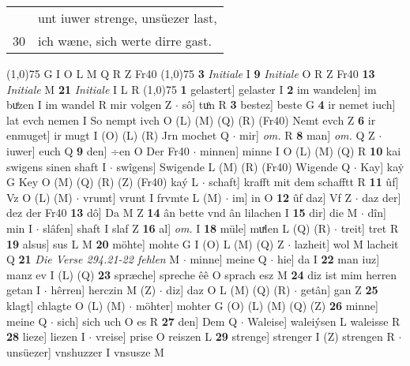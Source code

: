 \documentclass[8pt,a4paper,notitlepage]{article}
\begin{document}
\begin{table}[ht]
\begin{minipage}[t]{0.5\linewidth}
\begin{tabular}{rl}
 & unt iuwer strenge, unsüezer last,\\ 
30 & ich wæne, sich werte dirre gast.\\ 
\end{tabular}
\scriptsize
\line(1,0){75} \newline
G I O L M Q R Z Fr40 \newline
\line(1,0){75} \newline
\textbf{3} \textit{Initiale} I  \textbf{9} \textit{Initiale} O R Z Fr40  \textbf{13} \textit{Initiale} M  \textbf{21} \textit{Initiale} I L R  \newline
\line(1,0){75} \newline
\textbf{1} gelastert] gelaster I \textbf{2} im wandelen] im buͤzen I im wandel R mir volgen Z  $\cdot$ sô] tuͦn R \textbf{3} bestez] beste G \textbf{4} ir nemet iuch] lat evch nemen I So nempt ivch O (L) (M) (Q) (R) (Fr40) Nemt evch Z \textbf{6} ir enmuget] ir mugt I (O) (L) (R) Jrn mochet Q  $\cdot$ mir] \textit{om.} R \textbf{8} man] \textit{om.} Q Z  $\cdot$ iuwer] euch Q \textbf{9} den] ÷en O Der Fr40  $\cdot$ minnen] minne I O (L) (M) (Q) R \textbf{10} kai swigens sinen shaft I  $\cdot$ swîgens] Swigende L (M) (R) (Fr40) Wigende Q  $\cdot$ Kay] kaẏ G Key O (M) (Q) (R) (Z) (Fr40) kaý L  $\cdot$ schaft] krafft mit dem schafftt R \textbf{11} ûf] Vz O (L) (M)  $\cdot$ vrumt] vrunt I frvmte L (M)  $\cdot$ im] in O \textbf{12} ûf daz] Vf Z  $\cdot$ daz der] dez der Fr40 \textbf{13} dô] Da M Z \textbf{14} ân bette vnd ân lilachen I \textbf{15} dir] die M  $\cdot$ dîn] min I  $\cdot$ slâfen] shaft I slaf Z \textbf{16} al] \textit{om.} I \textbf{18} müle] muͯlen L (Q) (R)  $\cdot$ treit] tret R \textbf{19} alsus] sus L M \textbf{20} möhte] mohte G I (O) L (M) (Q) Z  $\cdot$ lazheit] wol M lacheit Q \textbf{21} \textit{Die Verse 294.21-22 fehlen} M   $\cdot$ minne] meine Q  $\cdot$ hie] da I \textbf{22} man iuz] manz ev I (L) (Q) \textbf{23} spræche] spreche êê O sprach esz M \textbf{24} diz ist mim herren getan I  $\cdot$ hêrren] herczin M (Z)  $\cdot$ diz] daz O L (M) (Q) (R)  $\cdot$ getân] gan Z \textbf{25} klagt] chlagte O (L) (M)  $\cdot$ möhter] mohter G (O) (L) (M) (Q) (Z) \textbf{26} minne] meine Q  $\cdot$ sich] sich uch O es R \textbf{27} den] Dem Q  $\cdot$ Waleise] waleiýsen L waleisse R \textbf{28} lieze] liezen I  $\cdot$ vreise] prise O reiszen L \textbf{29} strenge] strenger I (Z) strengen R  $\cdot$ unsüezer] vnshuzzer I vnsusze M \newline
\end{minipage}
\hspace{0.5cm}

\end{table}
\end{document}
